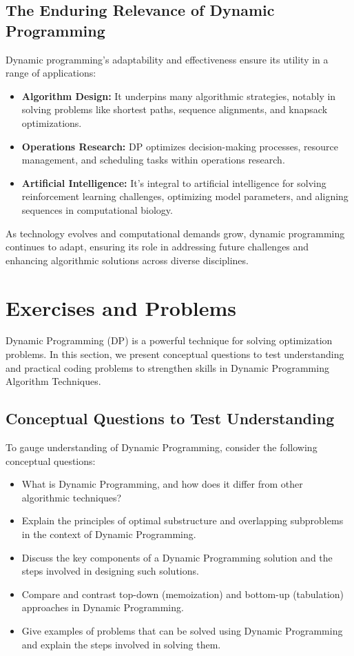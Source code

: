 \documentclass[12pt]{book} %
\begin{document}
\subsection{The Enduring Relevance of Dynamic Programming}

Dynamic programming's adaptability and effectiveness ensure its utility in a range of applications:
\begin{itemize}
    \item \textbf{Algorithm Design:} It underpins many algorithmic strategies, notably in solving problems like shortest paths, sequence alignments, and knapsack optimizations.
    \item \textbf{Operations Research:} DP optimizes decision-making processes, resource management, and scheduling tasks within operations research.
    \item \textbf{Artificial Intelligence:} It's integral to artificial intelligence for solving reinforcement learning challenges, optimizing model parameters, and aligning sequences in computational biology.
\end{itemize}

As technology evolves and computational demands grow, dynamic programming continues to adapt, ensuring its role in addressing future challenges and enhancing algorithmic solutions across diverse disciplines.


\section{Exercises and Problems}
Dynamic Programming (DP) is a powerful technique for solving optimization problems. In this section, we present conceptual questions to test understanding and practical coding problems to strengthen skills in Dynamic Programming Algorithm Techniques.

\subsection{Conceptual Questions to Test Understanding}
To gauge understanding of Dynamic Programming, consider the following conceptual questions:

\begin{itemize}
    \item What is Dynamic Programming, and how does it differ from other algorithmic techniques?
    \item Explain the principles of optimal substructure and overlapping subproblems in the context of Dynamic Programming.
    \item Discuss the key components of a Dynamic Programming solution and the steps involved in designing such solutions.
    \item Compare and contrast top-down (memoization) and bottom-up (tabulation) approaches in Dynamic Programming.
    \item Give examples of problems that can be solved using Dynamic Programming and explain the steps involved in solving them.
\end{itemize}
\end{document}
